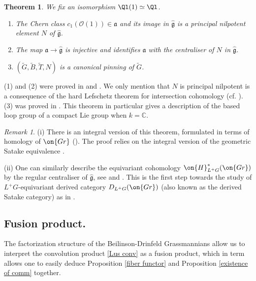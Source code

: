 \documentclass[]{pcmi}
\theoremstyle{plain}
\newtheorem{thm}[equation]{Theorem}
\theoremstyle{remark}
\newtheorem{rmk}[equation]{Remark}
\theoremstyle{definition}
\newcommand{\fraka}{{\mathfrak a}}
\newcommand{\frakg}{{\mathfrak g}}
\newcommand{\bC}{{\mathbb C}}
\newcommand{\mO}{{\mathcal O}}
\newcommand{\Gr}{{\on{Gr}}}
\begin{document}
\begin{thm} \label{canonical pinning}We fix an isomorphism $\Ql(1)\simeq \Ql$.
\begin{enumerate}
\item The Chern class $c_1(\mO(1))\in \fraka$ and its image in $\hat \frakg$ is a principal nilpotent element $N$ of $\hat \frakg$. 

\item The map $\fraka\to\hat\frakg$ is injective and identifies $\fraka$ with the centraliser of $N$ in $\hat\frakg$.

\item $(\tilde G,\tilde B,\tilde T, N)$ is a canonical pinning of $\tilde G$.
\end{enumerate}
\end{thm}
(1) and (2) were proved in \cite[\S 4]{Gi1} and \cite{YZ}. We only mention that $N$ is principal nilpotent is a consequence of the hard Lefschetz theorem for intersection cohomology (cf. \cite[Lemma 4.4.2]{Gi1}). (3) was proved in \cite{YZ}.
This theorem in particular gives a description of the based loop group of a compact Lie group when $k=\bC$.
\begin{rmk}
(i) There is an integral version of this theorem, formulated in terms of homology of $\Gr$ (\cite[Theorem 1.1]{YZ}). The proof relies on the integral version of the geometric Satake equivalence \cite{MV}.

(ii) One can similarly describe the equivariant cohomology $\on{H}^*_{L^+G}(\Gr)$ by the regular centraliser of $\hat\frakg$, see \cite[Theorem 2.12]{BFM} and \cite[Proposition 6.6]{YZ}. This is the first step towards the study of $L^+G$-equivariant derived category $D_{L^+G}(\Gr)$ (also known as the derived Satake category) as in \cite{BF}.
\end{rmk}






\subsection{Fusion product.}\label{fusion}
The factorization structure of the Beilinson-Drinfeld Grassmannians allow us to interpret the convolution product \eqref{Lus conv} as a fusion product, which in term allows one to easily deduce Proposition \ref{fiber functor} and Proposition \ref{existence of comm} together.
\end{document}
